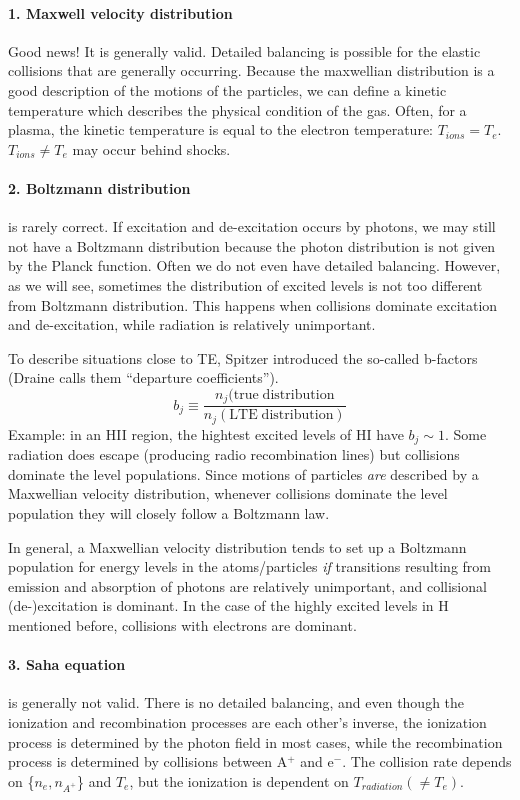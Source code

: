 \documentclass[12pt]{article}
\newcommand{\mar}[1]{\hspace{0pt}\marginpar{-\textcolor{black}{#1}-}}
\begin{document}
\paragraph{1. Maxwell velocity distribution} Good news! It is generally
valid. Detailed balancing is possible for the elastic collisions that are
generally occurring. Because the maxwellian distribution is a good
description of the motions of the particles, we can define a kinetic
temperature which describes the physical condition of the gas. Often,
for a plasma, the kinetic temperature is equal to the electron temperature:
$T_{ions} = T_{e}$. $T_{ions} \neq T_{e}$ may occur behind shocks.

\paragraph{2. Boltzmann distribution} is rarely correct.\mar{21}
If excitation and de-excitation occurs by photons, we may still not have a
Boltzmann distribution because the photon distribution is not given by the
Planck function. Often we do not even have detailed balancing.
However, as we will see, sometimes the distribution of excited levels
is not too different from Boltzmann distribution. This happens when collisions
dominate excitation and de-excitation, while radiation is relatively unimportant.

To describe situations close to TE, Spitzer introduced the so-called
b-factors (Draine calls them ``departure coefficients'').
$${ b_{j} \equiv
    \frac{n_{j}(\mathrm{true\; distribution}}{n_{j}(\mathrm{LTE\; distribution})}
}$$
Example: in an HII region, the hightest excited levels of HI have $b_{j} \sim 1$.
Some radiation does escape (producing radio recombination lines) but collisions
dominate the level populations. Since motions of particles \emph{are} described
by a Maxwellian velocity distribution, whenever collisions dominate the level
population they will closely follow a Boltzmann law.

In \mar{22}general, a Maxwellian velocity distribution tends to set up
a Boltzmann population for energy levels in the atoms/particles \emph{if}
transitions resulting from emission and absorption of photons are relatively
unimportant, and collisional (de-)excitation is dominant.
In the case of the highly excited levels in H mentioned before,
collisions with electrons are dominant.

\paragraph{3. Saha equation} is generally not valid. There is no detailed
balancing, and even though the ionization and recombination processes are
each other's inverse, the ionization process is determined by the photon
field in most cases, while the recombination process is determined by collisions
between A$^{+}$ and e$^{-}$. The collision rate depends on \{$n_{e}, n_{A^{+}}$\}
and $T_{e}$, but the ionization is dependent on $T_{radiation} (\neq T_{e})$.
\end{document}
